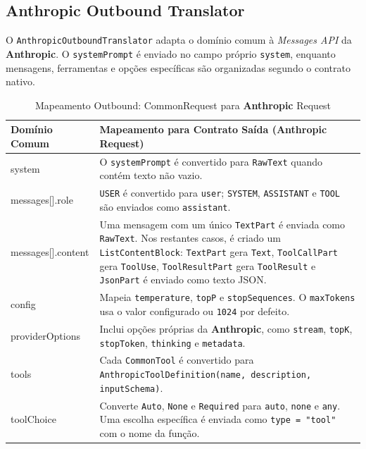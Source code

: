     \subsection{\textbf{Anthropic} Outbound Translator}

    O \texttt{AnthropicOutboundTranslator} adapta o domínio comum à \textit{Messages API} da \textbf{Anthropic}. O \texttt{systemPrompt} é enviado no campo próprio \texttt{system}, enquanto mensagens, ferramentas e opções específicas são organizadas segundo o contrato nativo.

    \begin{table}[H]
        \centering
        \footnotesize
        \renewcommand{\arraystretch}{1.25}
        \begin{tabularx}{\textwidth}{|>{\ttfamily\raggedright\arraybackslash}p{4cm}|Y|}
            \hline
            \textbf{Domínio Comum} & \textbf{Mapeamento para Contrato Saída (Anthropic Request)} \\
            \hline
            system & O \texttt{systemPrompt} é convertido para \texttt{RawText} quando contém texto não vazio. \\
            \hline
            messages[].role & \texttt{USER} é convertido para \texttt{user}; \texttt{SYSTEM}, \texttt{ASSISTANT} e \texttt{TOOL} são enviados como \texttt{assistant}. \\
            \hline
            messages[].content & Uma mensagem com um único \texttt{TextPart} é enviada como \texttt{RawText}. Nos restantes casos, é criado um \texttt{ListContentBlock}: \texttt{TextPart} gera \texttt{Text}, \texttt{ToolCallPart} gera \texttt{ToolUse}, \texttt{ToolResultPart} gera \texttt{ToolResult} e \texttt{JsonPart} é enviado como texto JSON. \\
            \hline
            config & Mapeia \texttt{temperature}, \texttt{topP} e \texttt{stopSequences}. O \texttt{maxTokens} usa o valor configurado ou \texttt{1024} por defeito. \\
            \hline
            providerOptions & Inclui opções próprias da \textbf{Anthropic}, como \texttt{stream}, \texttt{topK}, \texttt{stopToken}, \texttt{thinking} e \texttt{metadata}. \\
            \hline
            tools & Cada \texttt{CommonTool} é convertido para \texttt{AnthropicToolDefinition(name, description, inputSchema)}. \\
            \hline
            toolChoice & Converte \texttt{Auto}, \texttt{None} e \texttt{Required} para \texttt{auto}, \texttt{none} e \texttt{any}. Uma escolha específica é enviada como \texttt{type = "tool"} com o nome da função. \\
            \hline
        \end{tabularx}
        \caption{Mapeamento Outbound: CommonRequest para \textbf{Anthropic} Request}
    \end{table}



